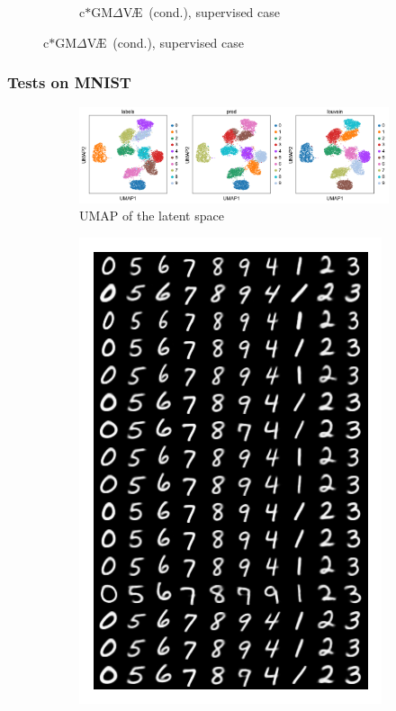 \documentclass[final]{beamer}
\theoremstyle{plain}
\theoremstyle{definition}
\theoremstyle{remark}
\newcommand{\gmvae}{c$\ast$GM$\Delta$V\AE~}
\begin{document}
\begin{frame}
\begin{figure}[h]
\begin{subfigure}[b]{0.45\textwidth}
\caption{\gmvae (cond.), supervised case}
\label{fig:dirgmmcvae_super}
\end{subfigure}
\end{figure}
\end{frame}

\begin{frame}
\frametitle{Tests on MNIST}
\begin{figure}[h]
\centering
\begin{subfigure}[b]{0.80\textwidth}
\includegraphics[width=\textwidth]{images/gmmvae_mnist_us_latent_umap.png}
\caption{UMAP of the latent space}
\label{fig:mnist_us_latent}
\end{subfigure}
\begin{subfigure}[b]{0.3\textwidth}
\includegraphics[width=\textwidth]{images/gmmvae_mnist_us_samples2.png}

\end{subfigure}
\end{figure}
\end{frame}
\end{document}
